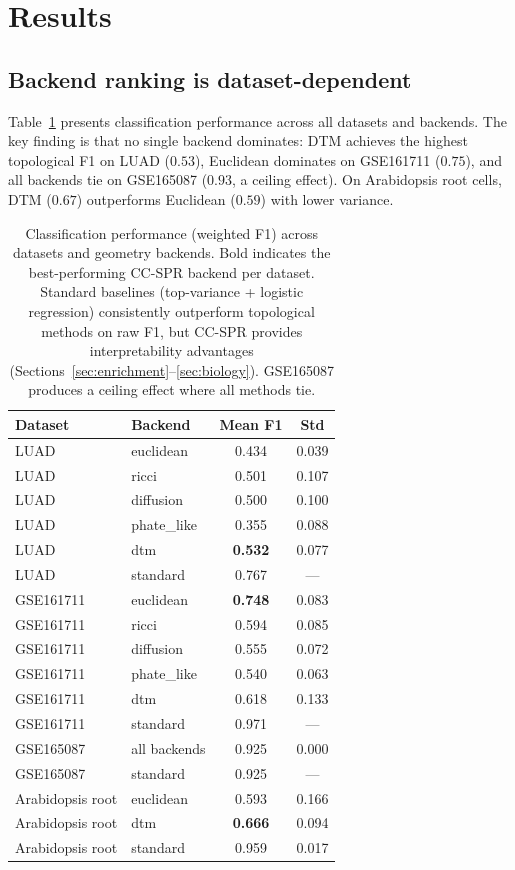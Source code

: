 \documentclass[11pt]{article}
\begin{document}
\section{Results}
\label{sec:results}

\subsection{Backend ranking is dataset-dependent}

Table~\ref{tab:benchmark} presents classification performance across all datasets and backends.
The key finding is that no single backend dominates: DTM achieves the highest topological F1 on LUAD ($0.53$), Euclidean dominates on GSE161711 ($0.75$), and all backends tie on GSE165087 ($0.93$, a ceiling effect).
On Arabidopsis root cells, DTM ($0.67$) outperforms Euclidean ($0.59$) with lower variance.

\begin{table}[h]
\centering
\small
\begin{tabular}{llcc}
\toprule
\textbf{Dataset} & \textbf{Backend} & \textbf{Mean F1} & \textbf{Std} \\
\midrule
LUAD & euclidean & 0.434 & 0.039 \\
LUAD & ricci & 0.501 & 0.107 \\
LUAD & diffusion & 0.500 & 0.100 \\
LUAD & phate\_like & 0.355 & 0.088 \\
LUAD & dtm & \textbf{0.532} & 0.077 \\
LUAD & standard & 0.767 & --- \\
\midrule
GSE161711 & euclidean & \textbf{0.748} & 0.083 \\
GSE161711 & ricci & 0.594 & 0.085 \\
GSE161711 & diffusion & 0.555 & 0.072 \\
GSE161711 & phate\_like & 0.540 & 0.063 \\
GSE161711 & dtm & 0.618 & 0.133 \\
GSE161711 & standard & 0.971 & --- \\
\midrule
GSE165087 & all backends & 0.925 & 0.000 \\
GSE165087 & standard & 0.925 & --- \\
\midrule
Arabidopsis root & euclidean & 0.593 & 0.166 \\
Arabidopsis root & dtm & \textbf{0.666} & 0.094 \\
Arabidopsis root & standard & 0.959 & 0.017 \\
\bottomrule
\end{tabular}
\caption{Classification performance (weighted F1) across datasets and geometry backends.
Bold indicates the best-performing CC-SPR backend per dataset.
Standard baselines (top-variance + logistic regression) consistently outperform topological methods on raw F1, but CC-SPR provides interpretability advantages (Sections~\ref{sec:enrichment}--\ref{sec:biology}).
GSE165087 produces a ceiling effect where all methods tie.}
\label{tab:benchmark}
\end{table}
\end{document}
